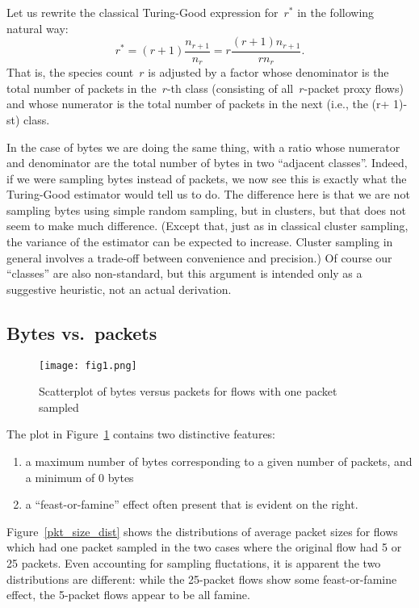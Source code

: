 \documentclass{paper}
\begin{document}
Let us rewrite the classical Turing-Good expression for~$r^*$ in the following
natural way:
$$ r^* =(r + 1) \frac{n_{r+1}}{n_r} = r \frac{(r+1)n_{r+1}}{rn_r}. $$
That is, the species count~$r$ is adjusted by a factor whose denominator is the
total number of packets in the~$r$-th class (consisting of all~$r$-packet proxy
flows) and whose numerator is the total number of packets in the next (i.e., the
(r+ 1)- st) class.

In the case of bytes we are doing the same thing, with a ratio whose numerator
and denominator are the total number of bytes in two ``adjacent classes''.
Indeed, if we were sampling bytes instead of packets, we now see this is exactly
what the Turing-Good estimator would tell us to do. The difference here is that
we are not sampling bytes using simple random sampling, but in clusters, but
that does not seem to make much difference. (Except that, just as in classical
cluster sampling, the variance of the estimator can be expected to increase.
Cluster sampling in general involves a trade-off between convenience and
precision.) Of course our ``classes'' are also non-standard, but this argument
is intended only as a suggestive heuristic, not an actual derivation.

\subsection{Bytes vs.\ packets}

\begin{figure}[h]
\begin{center}
\texttt{[image: fig1.png]}
\caption{Scatterplot of bytes versus packets for flows with one packet sampled}
\label{pb_plot}
\end{center}
\end{figure}

The plot in Figure~\ref{pb_plot} contains two distinctive features:
\begin{enumerate}
  \item a maximum number of bytes corresponding to a given number of packets,
  and a minimum of 0 bytes
  \item a ``feast-or-famine'' effect often present that is evident on the
  right.
\end{enumerate}
Figure~\ref{pkt_size_dist} shows the distributions of average packet sizes for flows which
had one packet sampled in the two cases where the original flow had 5 or 25
packets. Even accounting for sampling fluctations, it is apparent the two
distributions are different: while the 25-packet flows show some feast-or-famine
effect, the 5-packet flows appear to be all famine.
\end{document}

